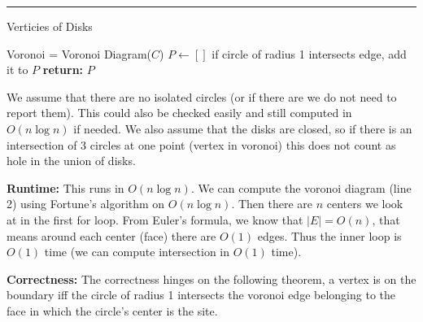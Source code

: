 \documentclass[11pt]{article}
\begin{document}
\hrule





\begin{algorithm}[H]
    \caption{Verticies of Disks}
    \label{alg:neighbors}
    \begin{algorithmic}[1]
        \State Voronoi = Voronoi Diagram($C$)
        \State $P \gets []$
                \State if circle of radius 1 intersects edge, add it to $P$
            \EndFor
        \EndFor
        \State \textbf{return: } $P$
    \EndFunction
    \end{algorithmic}
\end{algorithm}


We assume that there are no isolated circles (or if there are we do not need to report them).
This could also be checked easily and still computed in $O(n \log n)$ if needed.
We also assume that the disks are closed, so if there is an intersection of 3 circles
at one point (vertex in voronoi) this does not count as hole in the union of disks.

\textbf{Runtime: }
This runs in $O(n \log n)$. We can compute the voronoi diagram (line 2)
using Fortune's algorithm on $O(n \log n)$. 
Then there are $n$ centers we look at in the first for loop.
From Euler's formula, we know that $|E| = O(n)$, that means around each center (face)
there are $O(1)$ edges. Thus the inner loop is $O(1)$ time (we can compute intersection in $O(1)$ time).

\textbf{Correctness: }
The correctness hinges on the following theorem,
a vertex is on the boundary iff the circle of radius 1 intersects the voronoi
edge belonging to the face in which the circle's center is the site. 
\end{document}
